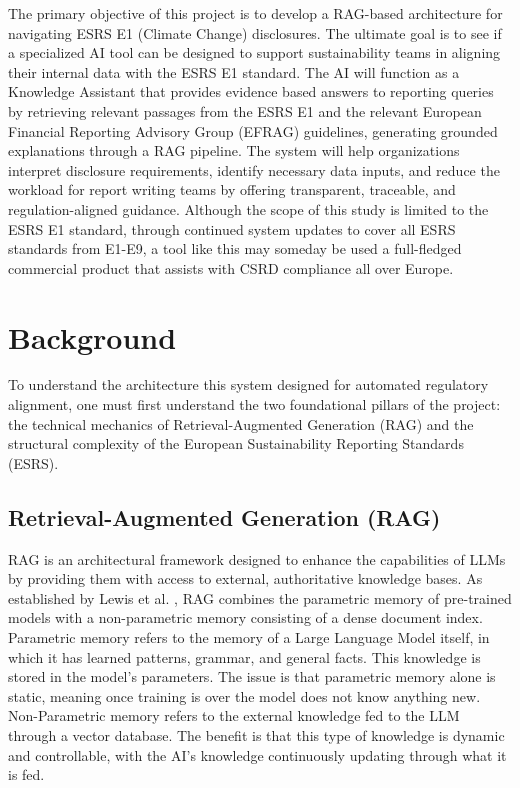 \documentclass[12pt]{article}
\begin{document}
The primary objective of this project is to develop a RAG-based architecture for navigating ESRS E1 (Climate Change) disclosures. The ultimate goal is to see if a specialized AI tool can be designed to support sustainability teams in aligning their internal data with the ESRS E1 standard. The AI will function as a Knowledge Assistant that provides evidence based answers to reporting queries by retrieving relevant passages from the ESRS E1 and the relevant European Financial Reporting Advisory Group (EFRAG) guidelines, generating grounded explanations through a RAG pipeline. The system will help organizations interpret disclosure requirements, identify necessary data inputs, and reduce the workload for report writing teams by offering transparent, traceable, and regulation-aligned guidance. Although the scope of this study is limited to the ESRS E1 standard, through continued system updates to cover all ESRS standards from E1-E9, a tool like this may someday be used a full-fledged commercial product that assists with CSRD compliance all over Europe.


\section{Background}
To understand the architecture this system designed for automated regulatory alignment, one must first understand the two foundational pillars of the project: the technical mechanics of Retrieval-Augmented Generation (RAG) and the structural complexity of the European Sustainability Reporting Standards (ESRS).

\subsection{Retrieval-Augmented Generation (RAG)}
RAG is an architectural framework designed to enhance the capabilities of LLMs by providing them with access to external, authoritative knowledge bases. As established by Lewis et al. \cite{lewis2021retrievalaugmentedgenerationknowledgeintensivenlp}, RAG combines the parametric memory of pre-trained models with a non-parametric memory consisting of a dense document index. Parametric memory refers to the memory of a Large Language Model itself, in which it has learned patterns, grammar, and general facts. This knowledge is stored in the model's parameters. The issue is that parametric memory alone is static, meaning once training is over the model does not know anything new. Non-Parametric memory refers to the external knowledge fed to the LLM through a vector database. The benefit is that this type of knowledge is dynamic and controllable, with the AI's knowledge continuously updating through what it is fed. 
\end{document}
